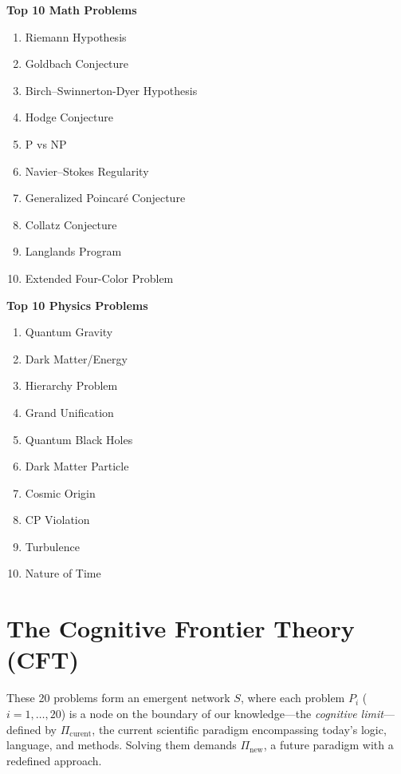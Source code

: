 \documentclass[12pt]{article}
\begin{document}
\begin{center}
\begin{minipage}{0.48\textwidth}
\raggedright
\textbf{Top 10 Math Problems}
\begin{enumerate}
  \item Riemann Hypothesis
  \item Goldbach Conjecture
  \item Birch–Swinnerton-Dyer Hypothesis
  \item Hodge Conjecture
  \item P vs NP
  \item Navier–Stokes Regularity
  \item Generalized Poincaré Conjecture
  \item Collatz Conjecture
  \item Langlands Program
  \item Extended Four-Color Problem
\end{enumerate}
\end{minipage}
\begin{minipage}{0.48\textwidth}
\raggedright
\textbf{Top 10 Physics Problems}
\begin{enumerate}
  \item Quantum Gravity
  \item Dark Matter/Energy
  \item Hierarchy Problem
  \item Grand Unification
  \item Quantum Black Holes
  \item Dark Matter Particle
  \item Cosmic Origin
  \item CP Violation
  \item Turbulence
  \item Nature of Time
\end{enumerate}
\end{minipage}
\end{center}

\section*{The Cognitive Frontier Theory (CFT)}
These 20 problems form an emergent network \(S\), where each problem \(P_i\) (\(i=1,\dots,20\)) is a node on the boundary of our knowledge—the \emph{cognitive limit}—defined by \(\Pi_{\text{curent}}\), the current scientific paradigm encompassing today’s logic, language, and methods. Solving them demands \(\Pi_{\text{new}}\), a future paradigm with a redefined approach.
\end{document}
